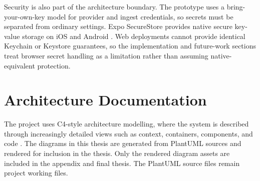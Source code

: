 Security is also part of the architecture boundary. The prototype uses a bring-your-own-key model for provider and ingest credentials, so secrets must be separated from ordinary settings. Expo SecureStore provides native secure key-value storage on iOS and Android \cite{expo-securestore}. Web deployments cannot provide identical Keychain or Keystore guarantees, so the implementation and future-work sections treat browser secret handling as a limitation rather than assuming native-equivalent protection.

\section{Architecture Documentation}

The project uses C4-style architecture modelling, where the system is described through increasingly detailed views such as context, containers, components, and code \cite{c4-model}. The diagrams in this thesis are generated from PlantUML sources and rendered for inclusion in the thesis. Only the rendered diagram assets are included in the appendix and final thesis. The PlantUML source files remain project working files.
